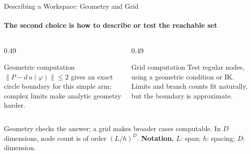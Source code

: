 \documentclass[aspectratio=169]{beamer}
\begin{document}
\begin{frame}[t]{Describing a Workspace: Geometry and Grid}
    \framesubtitle{The second choice is how to describe or test the reachable set}
    \begin{columns}[T,onlytextwidth]
        \begin{column}{0.49\textwidth}
            \begin{block}{Geometric computation}
                $\|P-d\,u(\varphi)\|\leq2$ gives an exact circle boundary for this simple arm; complex limits make analytic geometry harder.
            \end{block}
            \centering
        \end{column}
        \begin{column}{0.49\textwidth}
            \begin{block}{Grid computation}
                Test regular nodes, using a geometric condition or IK. Limits and branch counts fit naturally, but the boundary is approximate.
            \end{block}
            \centering
        \end{column}
    \end{columns}
    \scriptsize Geometry checks the answer; a grid makes broader cases computable. In $D$ dimensions, node count is of order $(L/h)^D$. \textbf{Notation.} $L$: span; $h$: spacing; $D$: dimension.
\end{frame}
\end{document}
